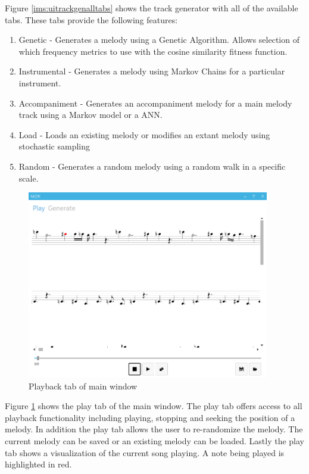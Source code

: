 Figure \ref{ims:uitrackgenalltabs} shows the track generator with all of the available tabs.
These tabs provide the following features:
\begin{enumerate}
\item Genetic - Generates a melody using a Genetic Algorithm. Allows selection of which frequency metrics to use with the cosine similarity fitness function.
\item Instrumental - Generates a melody using Markov Chains for a particular instrument.
\item Accompaniment - Generates an accompaniment melody for a main melody track using a Markov model or a \ac{ANN}.
\item Load - Loads an existing melody or modifies an extant melody using stochastic sampling
\item Random - Generates a random melody using a random walk in a specific scale.
\end{enumerate}

\begin{figure}
\centerline{\includegraphics[width=400px]{../images/res_ui_playback.png}}
\caption{Playback tab of main window}
\label{ims:res_ui_playback}
\end{figure}

Figure \ref{ims:res_ui_playback} shows the play tab of the main window. The play tab offers access to all playback functionality including playing, stopping and seeking the position of a melody.
In addition the play tab allows the user to re-randomize the melody. The current melody can be saved or an existing melody can be loaded.
Lastly the play tab shows a visualization of the current song playing. A note being played is highlighted in red.

